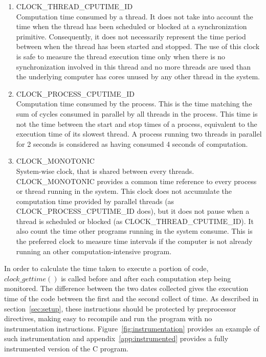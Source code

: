 \begin{enumerate}
\item CLOCK\_THREAD\_CPUTIME\_ID\\
Computation time consumed by a thread. It does not take into account the time when the thread has been scheduled or blocked at a synchronization primitive. Consequently, it does not necessarily represent the time period between when the thread has been started and stopped. The use of this clock is safe to measure the thread execution time only when there is no synchronization involved in this thread and no more threads are used than the underlying computer has cores unused by any other thread in the system.
\item CLOCK\_PROCESS\_CPUTIME\_ID\\
Computation time consumed by the process. This is the time matching the sum of cycles consumed in parallel by all threads in the process. This time is not the time between the start and stop times of a process, equivalent to the execution time of its slowest thread. A process running two threads in parallel for 2 seconds is considered as having consumed 4 seconds of computation.
\item CLOCK\_MONOTONIC\\
System-wise clock, that is shared between every threads. CLOCK\_MONOTONIC provides a common time reference to every process or thread running in the system. This clock does not accumulate the computation time provided by parallel threads (as CLOCK\_PROCESS\_CPUTIME\_ID does), but it does not pause when a thread is scheduled or blocked (as CLOCK\_THREAD\_CPUTIME\_ID). It also count the time other programs running in the system consume. This is the preferred clock to measure time intervals if the computer is not already running an other computation-intensive program.
\end{enumerate}

In order to calculate the time taken to execute a portion of code, $clock\_gettime()$ is called before and after each computation step being monitored. The difference between the two dates collected gives the execution time of the code between the first and the second collect of time. As described in section~\ref{sec:setup}, these instructions should be protected by preprocessor directives, making easy to recompile and run the program with no instrumentation instructions. Figure~\ref{fig:instrumentation} provides an example of such instrumentation and appendix~\ref{app:instrumented} provides a fully instrumented version of the {C} program.


